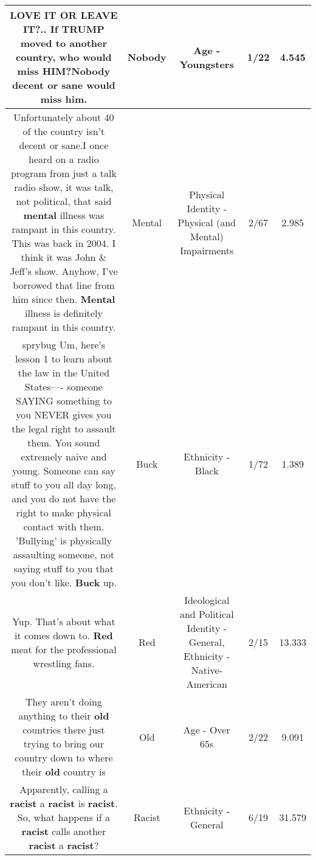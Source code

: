 \documentclass[11pt]{article}
\newlength\mylength
\begin{document}
\begin{center}
\begin{longtable}{|C{.65\mylength}|C{.30\mylength}|C{.12\mylength}|C{.12\mylength}|C{.12\mylength}|}
  \small LOVE IT OR LEAVE IT?.. If TRUMP moved to another country, who would miss HIM?\textbf{Nobody} decent or sane would miss him.\normalsize   & Nobody & Age - Youngsters & 1/22 & 4.545 \\  \hline
  \small Unfortunately about 40 of the country isn't decent or sane.I once heard on a radio program from just a talk radio show, it was talk, not political, that said \textbf{mental} illness was rampant in this country.  This was back in 2004.  I think it was John \& Jeff's show.  Anyhow, I've borrowed that line from him since then.  \textbf{Mental} illness is definitely rampant in this country.\normalsize   & Mental & Physical Identity - Physical (and Mental) Impairments & 2/67 & 2.985 \\  \hline
  \small sprybug Um, here's lesson 1 to learn about the law in the United States—- someone SAYING something to you NEVER gives you the legal right to assault them.  You sound extremely naive and young.  Someone can say stuff to you all day long, and you do not have the right to make physical contact with them.  'Bullying' is physically assaulting someone, not saying stuff to you that you don't like.  \textbf{Buck} up.\normalsize   & Buck & Ethnicity - Black & 1/72 & 1.389 \\  \hline
  \small Yup. That's about what it comes down to. \textbf{R\textbf{ed}} meat for the professional wrestling fans.\normalsize   & Red &  Ideological and Political Identity - General, Ethnicity - Native-American & 2/15 & 13.333 \\  \hline
  \small They aren't doing anything to their \textbf{old} countries there just trying to bring our country down to where their \textbf{old} country is\normalsize   & Old & Age - Over 65s & 2/22 & 9.091 \\  \hline
  \small Apparently, calling a \textbf{racist} a \textbf{racist} is \textbf{racist}. So, what happens if a \textbf{racist} calls another \textbf{racist} a \textbf{racist}?\normalsize   & Racist & Ethnicity - General & 6/19 & 31.579 \\  \hline

\end{longtable}
\end{center}
\end{document}
